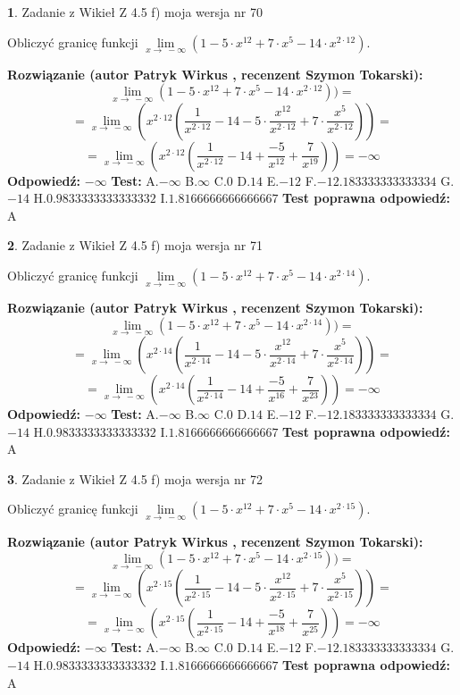 \documentclass[12pt, a4paper]{article}
\theoremstyle{definition} %
\newtheorem{zad}{}
\newcommand{\zadStart}[1]{\begin{zad}#1\newline}
\newcommand{\zadStop}{\end{zad}}
\newcommand{\rozwStart}[2]{\noindent \textbf{Rozwiązanie (autor #1 , recenzent #2): }\newline}
\newcommand{\rozwStop}{\newline}
\newcommand{\odpStart}{\noindent \textbf{Odpowiedź:}\newline}
\newcommand{\odpStop}{\newline}
\newcommand{\testStart}{\noindent \textbf{Test:}\newline}
\newcommand{\testStop}{\newline}
\newcommand{\kluczStart}{\noindent \textbf{Test poprawna odpowiedź:}\newline}
\newcommand{\kluczStop}{\newline}
\begin{document}
\zadStart{Zadanie z Wikieł Z 4.5 f) moja wersja nr 70}


Obliczyć granicę funkcji  $\lim\limits_{x\to\ -\infty}(1 - 5 \cdot x^{12}+7 \cdot x^{5}- 14 \cdot x^{2\cdot12})$.
\zadStop
\rozwStart{Patryk Wirkus}{Szymon Tokarski}
$$\lim\limits_{x\to\ -\infty}(1 - 5 \cdot x^{12}+7 \cdot x^{5}- 14 \cdot x^{2\cdot12}))=$$
$$=\lim\limits_{x\to\ -\infty}(x^{2\cdot12}(\frac{1}{x^{2\cdot12}}-14 -5 \cdot \frac{x^{12}}{x^{2\cdot12}}+7 \cdot \frac{x^{5}}{x^{2\cdot12}}))=$$
$$=\lim\limits_{x\to\ -\infty}(x^{2\cdot12}(\frac{1}{x^{2\cdot12}}-14 + \frac{-5}{x^{12}}+ \frac{7}{x^{19}}))=-\infty$$
\rozwStop
\odpStart
$-\infty$
\odpStop
\testStart
A.$-\infty$ B.$\infty$ C.$0$ D.$14$ E.$-12$
F.$-12.183333333333334$ G.$-14$
H.$0.9833333333333332$
I.$1.8166666666666667$
\testStop
\kluczStart
A
\kluczStop



\zadStart{Zadanie z Wikieł Z 4.5 f) moja wersja nr 71}


Obliczyć granicę funkcji  $\lim\limits_{x\to\ -\infty}(1 - 5 \cdot x^{12}+7 \cdot x^{5}- 14 \cdot x^{2\cdot14})$.
\zadStop
\rozwStart{Patryk Wirkus}{Szymon Tokarski}
$$\lim\limits_{x\to\ -\infty}(1 - 5 \cdot x^{12}+7 \cdot x^{5}- 14 \cdot x^{2\cdot14}))=$$
$$=\lim\limits_{x\to\ -\infty}(x^{2\cdot14}(\frac{1}{x^{2\cdot14}}-14 -5 \cdot \frac{x^{12}}{x^{2\cdot14}}+7 \cdot \frac{x^{5}}{x^{2\cdot14}}))=$$
$$=\lim\limits_{x\to\ -\infty}(x^{2\cdot14}(\frac{1}{x^{2\cdot14}}-14 + \frac{-5}{x^{16}}+ \frac{7}{x^{23}}))=-\infty$$
\rozwStop
\odpStart
$-\infty$
\odpStop
\testStart
A.$-\infty$ B.$\infty$ C.$0$ D.$14$ E.$-12$
F.$-12.183333333333334$ G.$-14$
H.$0.9833333333333332$
I.$1.8166666666666667$
\testStop
\kluczStart
A
\kluczStop



\zadStart{Zadanie z Wikieł Z 4.5 f) moja wersja nr 72}


Obliczyć granicę funkcji  $\lim\limits_{x\to\ -\infty}(1 - 5 \cdot x^{12}+7 \cdot x^{5}- 14 \cdot x^{2\cdot15})$.
\zadStop
\rozwStart{Patryk Wirkus}{Szymon Tokarski}
$$\lim\limits_{x\to\ -\infty}(1 - 5 \cdot x^{12}+7 \cdot x^{5}- 14 \cdot x^{2\cdot15}))=$$
$$=\lim\limits_{x\to\ -\infty}(x^{2\cdot15}(\frac{1}{x^{2\cdot15}}-14 -5 \cdot \frac{x^{12}}{x^{2\cdot15}}+7 \cdot \frac{x^{5}}{x^{2\cdot15}}))=$$
$$=\lim\limits_{x\to\ -\infty}(x^{2\cdot15}(\frac{1}{x^{2\cdot15}}-14 + \frac{-5}{x^{18}}+ \frac{7}{x^{25}}))=-\infty$$
\rozwStop
\odpStart
$-\infty$
\odpStop
\testStart
A.$-\infty$ B.$\infty$ C.$0$ D.$14$ E.$-12$
F.$-12.183333333333334$ G.$-14$
H.$0.9833333333333332$
I.$1.8166666666666667$
\testStop
\kluczStart
A
\kluczStop
\end{document}
